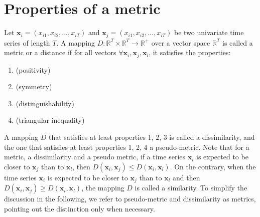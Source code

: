 \section{Properties of a metric}
Let $\textbf{x}_i=(x_{i1}, x_{i2}, ..., x_{iT})$ and $\textbf{x}_j=(x_{i1}, x_{i2}, ..., x_{iT})$ be two univariate time series of length $T$. A mapping $D:\mathbb{R}^T \times \mathbb{R}^T \rightarrow \mathbb{R}^+$ over a vector space $\mathbb{R}^T$ is called a metric or a distance if for all vectors $\forall \textbf{x}_i, \textbf{x}_j, \textbf{x}_l$, it satisfies the properties:
\begin{enumerate}
	\item { (positivity)}
	\item { (symmetry)}	
	\item { (distinguishability)}
	\item { (triangular inequality)}
\end{enumerate}
A mapping $D$ that satisfies at least properties 1, 2, 3 is called a dissimilarity, and the one that satisfies at least properties 1, 2, 4 a pseudo-metric. Note that for a metric, a dissimilarity and a pseudo metric, if a time series $\textbf{x}_i$ is expected to be closer to $\textbf{x}_j$ than to $\textbf{x}_l$, then $D(\textbf{x}_i,\textbf{x}_j) \leq D(\textbf{x}_i,\textbf{x}_l)$. On the contrary, when the time series $\textbf{x}_i$ is expected to be closer to $\textbf{x}_j$ than to $\textbf{x}_l$ and then $D(\textbf{x}_i,\textbf{x}_j) \geq D(\textbf{x}_i,\textbf{x}_l)$, the mapping $D$ is called a similarity. To simplify the discussion in the following, we refer to pseudo-metric and dissimilarity as metrics, pointing out the distinction only when necessary.




